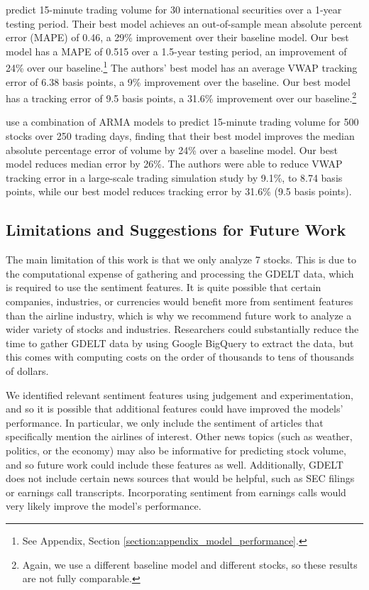 \documentclass[12pt]{article}
\begin{document}
\textcite{chen2016forecasting} predict 15-minute trading volume for 30 international securities over a 1-year testing period. Their best model achieves an out-of-sample mean absolute percent error (MAPE) of 0.46, a 29\% improvement over their baseline model. Our best model has a MAPE of 0.515 over a 1.5-year testing period, an improvement of 24\% over our baseline.\footnote{See Appendix, Section \ref{section:appendix_model_performance}.} The authors' best model has an average VWAP tracking error of 6.38 basis points, a 9\% improvement over the baseline. Our best model has a tracking error of 9.5 basis points, a 31.6\% improvement over our baseline.\footnote{Again, we use a different baseline model and different stocks, so these results are not fully comparable.}

\textcite{satish2014predicting} use a combination of ARMA models to predict 15-minute trading volume for 500 stocks over 250 trading days, finding that their best model improves the median absolute percentage error of volume by 24\% over a baseline model. Our best model reduces median error by 26\%. The authors were able to reduce VWAP tracking error in a large-scale trading simulation study by 9.1\%, to 8.74 basis points, while our best model reduces tracking error by 31.6\% (9.5 basis points).

\subsection{Limitations and Suggestions for Future Work}
The main limitation of this work is that we only analyze 7 stocks. This is due to the computational expense of gathering and processing the GDELT data, which is required to use the sentiment features. It is quite possible that certain companies, industries, or currencies would benefit more from sentiment features than the airline industry, which is why we recommend future work to analyze a wider variety of stocks and industries. Researchers could substantially reduce the time to gather GDELT data by using Google BigQuery to extract the data, but this comes with computing costs on the order of thousands to tens of thousands of dollars.

We identified relevant sentiment features using judgement and experimentation, and so it is possible that additional features could have improved the models' performance. In particular, we only include the sentiment of articles that specifically mention the airlines of interest. Other news topics (such as weather, politics, or the economy) may also be informative for predicting stock volume, and so future work could include these features as well. Additionally, GDELT does not include certain news sources that would be helpful, such as SEC filings or earnings call transcripts. Incorporating sentiment from earnings calls would very likely improve the model's performance.
\end{document}
